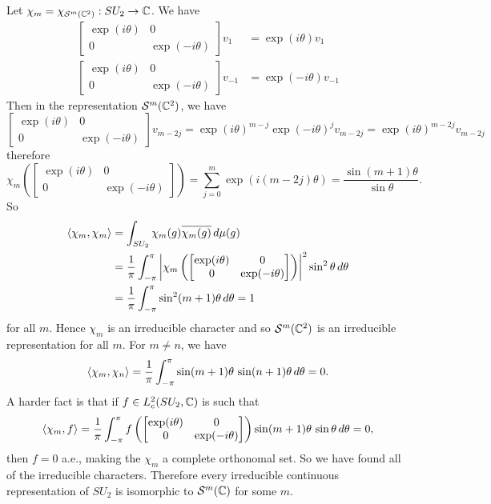 \begin{exam}[$SU_2$]
  Let $\chi_m = \chi_{\mathcal{S}^m(\mathbb{C}^2)}: SU_2 \to \mathbb{C}$.
  We have
  \begin{align*}
    \begin{bmatrix}
      \exp(i\theta) & 0 \\ 0 & \exp(-i\theta)
    \end{bmatrix}
    v_1 &= \exp(i\theta) v_1 \\
    \begin{bmatrix}
      \exp(i\theta) & 0 \\ 0 & \exp(-i\theta)
    \end{bmatrix}
    v_{-1} &= \exp(-i\theta) v_{-1}
  \end{align*}
  Then in the representation $\mathcal{S}^m(\mathbb{C}^2)$, we have
  \begin{equation*}
    \begin{bmatrix}
      \exp(i\theta) & 0 \\ 0 & \exp(-i\theta)
    \end{bmatrix}
    v_{m-2j} = \exp(i\theta)^{m-j} \exp(-i\theta)^j v_{m-2j} = \exp(i\theta)^{m-2j} v_{m-2j}
  \end{equation*}
  therefore
  \begin{equation*}
    \chi_m \left(
    \begin{bmatrix}
      \exp(i\theta) & 0 \\ 0 & \exp(-i\theta)
    \end{bmatrix}
  \right) = \sum_{j=0}^m \exp(i(m-2j)\theta) = \frac{\sin(m+1)\theta}{\sin\theta}.
  \end{equation*}
  So
  \begin{align*}
    {\left\langle \chi_m,\chi_m \right\rangle} &= \int_{SU_2} \chi_m(g) \overline{\chi_m(g)} \, d\mu(g) \\
    &= \frac 1\pi \int_{-\pi}^\pi \left\lvert 
      \chi_m \left( 
      \begin{bmatrix}
	\exp(i\theta) & 0 \\ 0 & \exp(-i\theta)
      \end{bmatrix}
      \right)
     \right\rvert^2 \sin^2\theta \, d\theta \\
    &= \frac 1\pi \int_{-\pi}^\pi \sin^2(m+1)\theta \, d\theta = 1
  \end{align*}
  for all $m$.
  Hence $\chi_m$ is an irreducible character and so $\mathcal{S}^m(\mathbb{C}^2)$ is an irreducible representation for all $m$.
  For $m \neq n$, we have
  \[ {\left\langle \chi_m,\chi_n \right\rangle} = \frac 1\pi \int_{-\pi}^\pi \sin(m+1)\theta \, \sin(n+1)\theta \, d\theta = 0. \]
  A harder fact is that if $f \in L^2_c(SU_2,\mathbb{C})$ is such that
  \[ {\left\langle \chi_m,f \right\rangle} = \frac 1\pi \int_{-\pi}^\pi f \left( 
    \begin{bmatrix}
      \exp(i\theta) & 0 \\ 0 & \exp(-i\theta)
    \end{bmatrix}
  \right) \sin(m+1)\theta \, \sin\theta \, d\theta = 0, \]
  then $f=0$ a.e., making the $\chi_m$ a complete orthonomal set.
  So we have found all of the irreducible characters.
  Therefore every irreducible continuous representation of $SU_2$ is isomorphic to $\mathcal{S}^m(\mathbb{C})$ for some $m$.
\end{exam}

